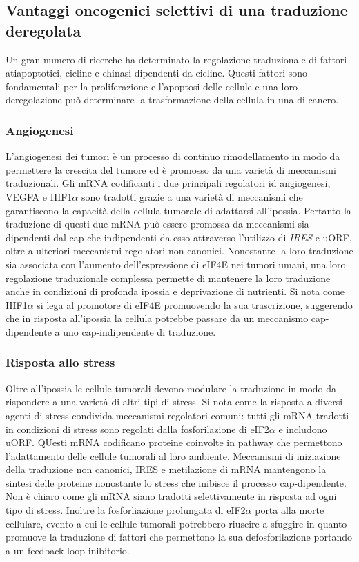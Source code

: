 	\subsection{Vantaggi oncogenici selettivi di una traduzione deregolata}
	Un gran numero di ricerche ha determinato la regolazione traduzionale di fattori atiapoptotici, cicline e chinasi dipendenti da cicline.
	Questi fattori sono fondamentali per la proliferazione e l'apoptosi delle cellule e una loro deregolazione pu\`o determinare la trasformazione della cellula in una di cancro.

		\subsubsection{Angiogenesi}
		L'angiogenesi dei tumori \`e un processo di continuo rimodellamento in modo da permettere la crescita del tumore ed \`e promosso da una variet\`a di meccanismi traduzionali.
		Gli mRNA codificanti i due principali regolatori id angiogenesi, VEGFA e HIF1$\alpha$ sono tradotti grazie a una variet\`a di meccanismi che garantiscono la capacit\`a della cellula tumorale di adattarsi all'ipossia.
		Pertanto la traduzione di questi due mRNA pu\`o essere promossa da meccanismi sia dipendenti dal cap che indipendenti da esso attraverso l'utilizzo di \emph{IRES} e uORF, oltre a ulteriori meccanismi regolatori non canonici.
		Nonostante la loro traduzione sia associata con l'aumento dell'espressione di eIF4E nei tumori umani, una loro regolazione traduzionale complessa permette di mantenere la loro traduzione anche in condizioni di profonda ipossia e deprivazione di nutrienti.
		Si nota come HIF1$\alpha$ si lega al promotore di eIF4E promuovendo la sua trascrizione, suggerendo che in risposta all'ipossia la cellula potrebbe passare da un meccanismo cap-dipendente a uno cap-indipendente di traduzione.

		\subsubsection{Risposta allo stress}
		Oltre all'ipossia le cellule tumorali devono modulare la traduzione in modo da rispondere a una variet\`a di altri tipi di stress.
		Si nota come la risposta a diversi agenti di stress condivida meccanismi regolatori comuni: tutti gli mRNA tradotti in condizioni di stress sono regolati dalla fosforilazione di eIF2$\alpha$ e includono uORF.
		QUesti mRNA codificano proteine coinvolte in pathway che permettono l'adattamento delle cellule tumorali al loro ambiente.
		Meccanismi di iniziazione della traduzione non canonici, IRES e metilazione di mRNA mantengono la sintesi delle proteine nonostante lo stress che inibisce il processo cap-dipendente.
		Non \`e chiaro come gli mRNA siano tradotti selettivamente in risposta ad ogni tipo di stress.
		Inoltre la fosforliazione prolungata di eIF2$\alpha$ porta alla morte cellulare, evento a cui le cellule tumorali potrebbero riuscire a sfuggire in quanto promuove la traduzione di fattori che permettono la sua defosforilazione portando a un feedback loop inibitorio.

